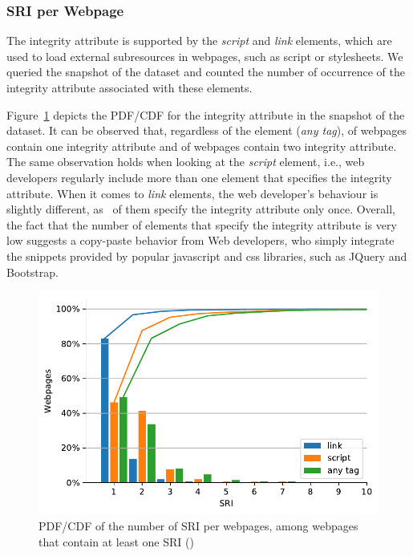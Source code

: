 \documentclass[sigconf,table]{acmart}
\begin{document}

\subsubsection{SRI per Webpage}

The integrity attribute is supported by the \textit{script} and \textit{link} elements, which are used to load external subresources in webpages, such as script or stylesheets.
We queried the \CCSnapshotLatest snapshot of the \CCSRI dataset and counted the number of occurrence of the integrity attribute associated with these elements.
 
Figure~\ref{fig:03} depicts the PDF/CDF for the integrity attribute in the \CCSnapshotLatest snapshot of the \CCSRI dataset.
It can be observed that, regardless of the element (\textit{any tag}), \CCOneSriPerWebpageP of webpages contain one integrity attribute and \CCTwoSriPerWebpageP of webpages contain two integrity attribute.
The same observation holds when looking at the \textit{script} element, i.e., web developers regularly include more than one element that specifies the integrity attribute.
When it comes to \textit{link} elements, the web developer's behaviour is slightly different, as \CCOneLinkSriPerWebpageP\ of them specify the integrity attribute only once.
Overall, the fact that the number of elements that specify the integrity attribute is very low suggests a copy-paste behavior from Web developers, who simply integrate the snippets provided by popular javascript and css libraries, such as JQuery and Bootstrap.

\begin{figure}[h]
	\includegraphics[width=\columnwidth]{../../notebooks/03_sri_per_page}
	\caption{PDF/CDF of the number of SRI per webpages, among webpages that contain at least one SRI (\CCUrlSriP)}
	\label{fig:03}
\end{figure}
\end{document}
